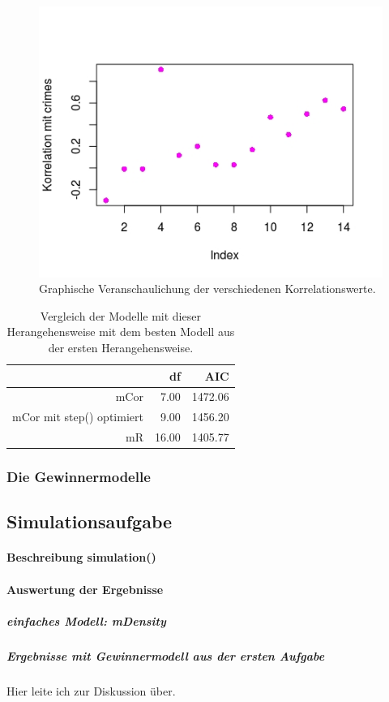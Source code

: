 \begin{figure}
\centering
\includegraphics[scale=.7]{./jpgs/corc.jpeg}
\caption{Graphische Veranschaulichung der verschiedenen Korrelationswerte.}
\label{fig:cor}
\end{figure} 

\begin{table}[ht]
\centering
\begin{tabular}{rrr}
  \hline
 & df & AIC \\ 
  \hline
mCor & 7.00 & 1472.06 \\ 
  mCor mit step() optimiert & 9.00 & 1456.20 \\ 
  mR & 16.00 & 1405.77 \\ 
   \hline
\end{tabular}
\caption{Vergleich der Modelle mit dieser Herangehensweise mit dem besten Modell aus der ersten Herangehensweise.}
\label{tab:co2}
\end{table}

\subsubsection{Die Gewinnermodelle}

\newpage 
\subsection{Simulationsaufgabe}
\paragraph{Beschreibung simulation()}
\paragraph{Auswertung der Ergebnisse}
\subparagraph{einfaches Modell: \textit{mDensity}}
\subparagraph{Ergebnisse mit Gewinnermodell aus der ersten Aufgabe}
Hier leite ich zur Diskussion \"uber.